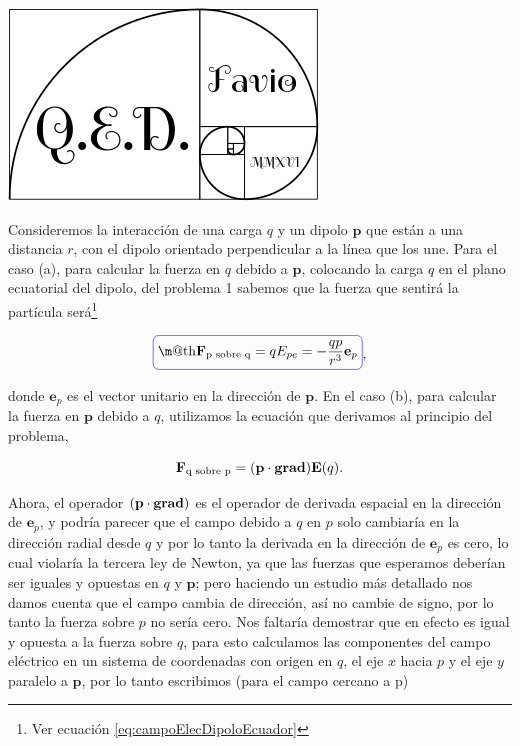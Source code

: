 \documentclass[a4paper,11pt]{article}
\makeatletter
\numberwithin{equation}{section}
\newcommand*{\boxcolor}{blue}
\renewcommand{\boxed}[1]{\textcolor{\boxcolor}{%
\tikz[baseline={([yshift=-1ex]current bounding box.center)}] \node [rectangle, minimum width=1ex,rounded corners,draw] {\normalcolor\m@th$\displaystyle#1$};}}
\makeatother
\begin{document}
\hspace{10cm}\includegraphics[scale=0.25]{logoQED}

Consideremos la interacción de una carga $q$ y un dipolo 
$\mathbf{p}$ que están a una distancia $r$, con el dipolo orientado perpendicular a 
la línea que los une. Para el caso (a), para calcular la fuerza en $q$ debido a 
$\mathbf{p}$, colocando la carga $q$ en el plano ecuatorial del dipolo, del problema 
1 sabemos que la fuerza que sentirá la partícula será\footnote{Ver ecuación 
\eqref{eq:campoElecDipoloEcuador}}

\begin{equation}
 \boxed{\mathbf{F}_{\text{p sobre q}} = q E_{pe} = - \frac{qp}{r^3}\mathbf{e}_p},
 \label{eq:dipoloPsobreQ}
\end{equation}

donde $\mathbf{e}_p$ es el vector unitario en la dirección de $\mathbf{p}$. En 
el caso (b), para calcular la fuerza en $\mathbf{p}$ debido a $q$, utilizamos 
la ecuación que derivamos al principio del problema, 

\begin{equation}
 \mathbf{F}_{\text{q sobre p}} = (\mathbf{p}\cdot \text{\textbf{grad}})\mathbf{E}(q).
\end{equation}

Ahora, el operador $(\mathbf{p}\cdot \text{\textbf{grad}})$ es el operador de 
derivada espacial en la dirección de $\mathbf{e}_p$, y podría parecer que el campo 
debido a $q$ en $p$ solo cambiaría en la dirección radial desde $q$ y por lo tanto 
la derivada en la dirección de $\mathbf{e}_p$ es cero, lo cual violaría la tercera 
ley de Newton, ya que las fuerzas que esperamos deberían ser iguales y opuestas en 
$q$ y $\mathbf{p}$; pero haciendo un estudio más detallado nos damos cuenta que 
el campo cambia de dirección, así no cambie de signo, por lo tanto la fuerza 
sobre $p$ no sería cero. Nos faltaría demostrar que en efecto es igual y opuesta 
a la fuerza sobre $q$, para esto calculamos las componentes del campo eléctrico 
en un sistema de coordenadas con origen en $q$, el eje $x$ hacia $p$ y el eje 
$y$ paralelo a $\mathbf{p}$, por lo tanto escribimos (para el campo cercano a p)
\end{document}
